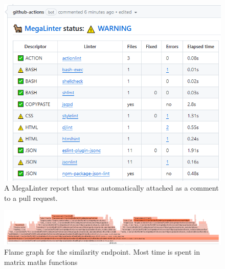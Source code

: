 \begin{figure}[h!]
  \centering
  \caption{\label{fig:metalinter_report}A MegaLinter report that was automatically attached as a comment to a pull request.}
  \includegraphics[width=\textwidth]{figures/megalinter_report.png}
\end{figure}

\begin{figure}
  \centering
  \caption{\label{fig:similarity_flamegraph}Flame graph for the similarity endpoint. Most time is spent in matrix maths functions}
  \includegraphics[angle=90,height=0.9\textheight]{figures/similarity_flamegraph.png}
\end{figure}

